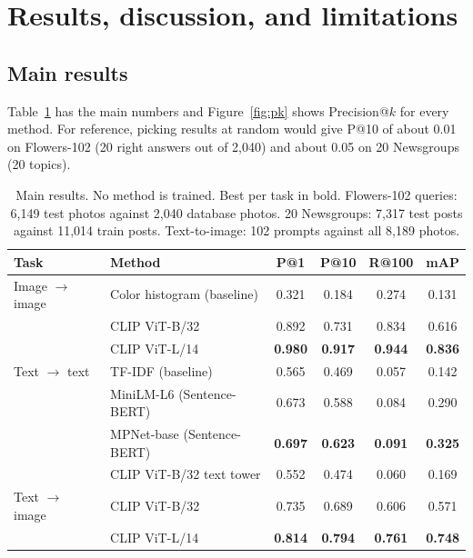 \documentclass{article}
\begin{document}
\section{Results, discussion, and limitations}
\label{sec:results}

\subsection{Main results}

Table~\ref{tab:main} has the main numbers and Figure~\ref{fig:pk} shows Precision@$k$ for every method. For reference, picking results at random would give P@10 of about 0.01 on Flowers-102 (20 right answers out of 2,040) and about 0.05 on 20 Newsgroups (20 topics).

\begin{table}[h]
\centering\small
\caption{Main results. No method is trained. Best per task in bold. Flowers-102 queries: 6,149 test photos against 2,040 database photos. 20 Newsgroups: 7,317 test posts against 11,014 train posts. Text-to-image: 102 prompts against all 8,189 photos.}
\label{tab:main}
\begin{tabular}{@{}llcccc@{}}
\toprule
Task & Method & P@1 & P@10 & R@100 & mAP \\
\midrule
Image $\rightarrow$ image & Color histogram (baseline) & 0.321 & 0.184 & 0.274 & 0.131 \\
 & CLIP ViT-B/32 & 0.892 & 0.731 & 0.834 & 0.616 \\
 & CLIP ViT-L/14 & \textbf{0.980} & \textbf{0.917} & \textbf{0.944} & \textbf{0.836} \\
\midrule
Text $\rightarrow$ text & TF-IDF (baseline) & 0.565 & 0.469 & 0.057 & 0.142 \\
 & MiniLM-L6 (Sentence-BERT) & 0.673 & 0.588 & 0.084 & 0.290 \\
 & MPNet-base (Sentence-BERT) & \textbf{0.697} & \textbf{0.623} & \textbf{0.091} & \textbf{0.325} \\
 & CLIP ViT-B/32 text tower & 0.552 & 0.474 & 0.060 & 0.169 \\
\midrule
Text $\rightarrow$ image & CLIP ViT-B/32 & 0.735 & 0.689 & 0.606 & 0.571 \\
 & CLIP ViT-L/14 & \textbf{0.814} & \textbf{0.794} & \textbf{0.761} & \textbf{0.748} \\
\bottomrule
\end{tabular}
\end{table}
\end{document}
